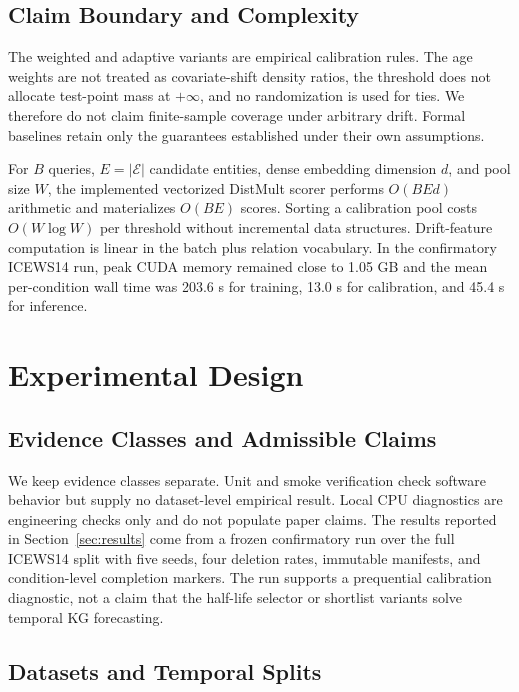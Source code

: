 \documentclass[information,article,submit,oneauthor,pdftex]{Definitions/mdpi}
\begin{document}
\subsection{Claim Boundary and Complexity}

The weighted and adaptive variants are empirical calibration rules. The age
weights are not treated as covariate-shift density ratios, the threshold does
not allocate test-point mass at \(+\infty\), and no randomization is used for
ties. We therefore do not claim finite-sample coverage under arbitrary drift.
Formal baselines retain only the guarantees established under their own
assumptions.

For \(B\) queries, \(E=|\mathcal{E}|\) candidate entities, dense embedding
dimension \(d\), and pool size \(W\), the implemented vectorized DistMult scorer
performs \(O(BEd)\) arithmetic and materializes \(O(BE)\) scores. Sorting a
calibration pool costs \(O(W\log W)\) per threshold without incremental data
structures. Drift-feature computation is linear in the batch plus relation
vocabulary. In the confirmatory ICEWS14 run, peak CUDA memory remained close to
1.05 GB and the mean per-condition wall time was 203.6 s for training, 13.0 s
for calibration, and 45.4 s for inference.

\iffalse
\section{Experimental Design}
\label{sec:experiments}

\subsection{Evidence Classes and Admissible Claims}

We keep evidence classes separate. Unit and smoke verification check software
behavior but supply no dataset-level empirical result. Local CPU diagnostics are
engineering checks only and do not populate paper claims. The results
reported in Section~\ref{sec:results} come from a frozen confirmatory run over
the full ICEWS14 split with five seeds, four deletion rates, immutable
manifests, and condition-level completion markers. The run supports a
prequential calibration diagnostic, not a claim that the half-life selector or
shortlist variants solve temporal KG forecasting.

\subsection{Datasets and Temporal Splits}
\end{document}
